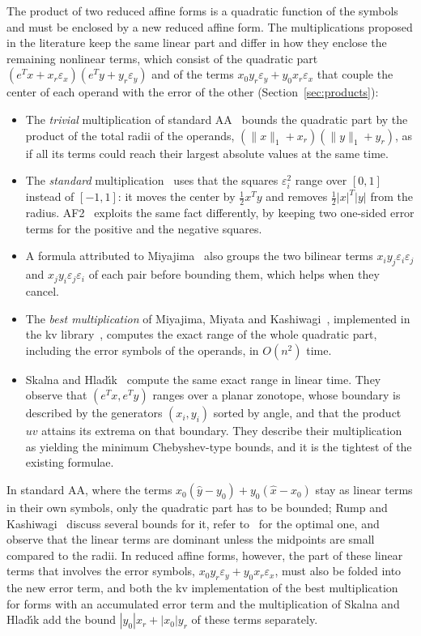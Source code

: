 \documentclass[10pt]{article}
\theoremstyle{definition}
\newcommand{\eps}{\varepsilon}
\newcommand{\ex}{\eps_x}
\newcommand{\ey}{\eps_y}
\begin{document}
The product of two reduced affine forms is a quadratic function of the symbols and must be enclosed by a new reduced affine form. The multiplications proposed in the literature keep the same linear part and differ in how they enclose the remaining nonlinear terms, which consist of the quadratic part $(e^Tx+x_r\ex)(e^Ty+y_r\ey)$ and of the terms $x_0y_r\ey+y_0x_r\ex$ that couple the center of each operand with the error of the other (Section~\ref{sec:products}):
\begin{itemize}
\item The \emph{trivial} multiplication of standard AA~\cite{stolfi1997self} bounds the quadratic part by the product of the total radii of the operands, $(\|x\|_1+x_r)(\|y\|_1+y_r)$, as if all its terms could reach their largest absolute values at the same time.
\item The \emph{standard} multiplication~\cite{kolev2004improved,vu2009enhancing} uses that the squares $\eps_i^2$ range over $[0,1]$ instead of $[-1,1]$: it moves the center by $\tfrac12x^Ty$ and removes $\tfrac12|x|^T|y|$ from the radius. AF2~\cite{messine2002extentions} exploits the same fact differently, by keeping two one-sided error terms for the positive and the negative squares.
\item A formula attributed to Miyajima~\cite{skalna2017new} also groups the two bilinear terms $x_iy_j\eps_i\eps_j$ and $x_jy_i\eps_j\eps_i$ of each pair before bounding them, which helps when they cancel.
\item The \emph{best multiplication} of Miyajima, Miyata and Kashiwagi~\cite{miyajima2003best}, implemented in the kv library~\cite{kvlib}, computes the exact range of the whole quadratic part, including the error symbols of the operands, in $O(n^2)$ time.
\item Skalna and Hlad\'{\i}k~\cite{skalna2017new} compute the same exact range in linear time. They observe that $(e^Tx,e^Ty)$ ranges over a planar zonotope, whose boundary is described by the generators $(x_i,y_i)$ sorted by angle, and that the product $uv$ attains its extrema on that boundary. They describe their multiplication as yielding the minimum Chebyshev-type bounds, and it is the tightest of the existing formulae.
\end{itemize}
In standard AA, where the terms $x_0(\hat y-y_0)+y_0(\hat x-x_0)$ stay as linear terms in their own symbols, only the quadratic part has to be bounded; Rump and Kashiwagi~\cite{rump2015implementation} discuss several bounds for it, refer to~\cite{miyajima2003best} for the optimal one, and observe that the linear terms are dominant unless the midpoints are small compared to the radii. In reduced affine forms, however, the part of these linear terms that involves the error symbols, $x_0y_r\ey+y_0x_r\ex$, must also be folded into the new error term, and both the kv implementation of the best multiplication for forms with an accumulated error term and the multiplication of Skalna and Hlad\'{\i}k add the bound $|y_0|x_r+|x_0|y_r$ of these terms separately.
\end{document}
